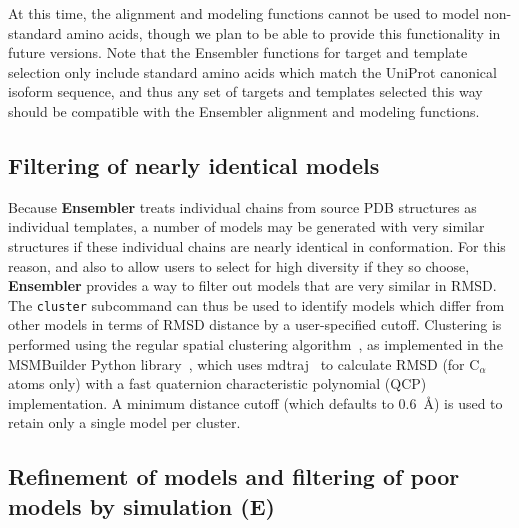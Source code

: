 \documentclass[aps,prl,preprint,nofootinbib,superscriptaddress,linenumbers]{revtex4-1}
\begin{document}
At this time, the alignment and modeling functions cannot be used to model non-standard amino acids, though we plan to be able to provide this functionality in future versions.
Note that the Ensembler functions for target and template selection only include standard amino acids which match the UniProt canonical isoform sequence, and thus any set of targets and templates selected this way should be compatible with the Ensembler alignment and modeling functions.

\subsection*{Filtering of nearly identical models}

Because {\bf Ensembler} treats individual chains from source PDB structures as individual templates, a number of models may be generated with very similar structures if these individual chains are nearly identical in conformation.
For this reason, and also to allow users to select for high diversity if they so choose, {\bf Ensembler} provides a way to filter out models that are very similar in RMSD.
The {\tt cluster} subcommand can thus be used to identify models which differ from other models in terms of RMSD distance by a user-specified cutoff.
Clustering is performed using the regular spatial clustering algorithm~\cite{noe:jcp:2011:msm-review}, as implemented in the MSMBuilder Python library~\cite{msmbuilder}, which uses mdtraj~\cite{mdtraj} to calculate RMSD (for C$_\alpha$ atoms only) with a fast quaternion characteristic polynomial (QCP)~\cite{theobald:acta-cryst-a:2005:qcp,theobald:j-comput-chem:2010:qcp,theobald:j-comput-chem:2011:qcp} implementation.
A minimum distance cutoff (which defaults to 0.6~\AA) is used to retain only a single model per cluster.

\subsection{Refinement of models and filtering of poor models by simulation (E)}
\end{document}
